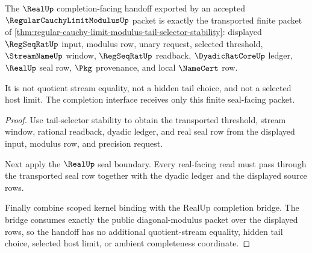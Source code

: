 \begin{theorem}
\label{thm:regular-cauchy-limit-modulus-real-seal-handoff}
The $\RealUp$ completion-facing handoff exported by an accepted $\RegularCauchyLimitModulusUp$ packet is exactly the transported finite packet of \autoref{thm:regular-cauchy-limit-modulus-tail-selector-stability}: displayed $\RegSeqRatUp$ input, modulus row, unary request, selected threshold, $\StreamNameUp$ window, $\RegSeqRatUp$ readback, $\DyadicRatCoreUp$ ledger, $\RealUp$ seal row, $\Pkg$ provenance, and local $\NameCert$ row.

It is not quotient stream equality, not a hidden tail choice, and not a selected host limit. The completion interface receives only this finite seal-facing packet.
\end{theorem}
\begin{proof}
Use tail-selector stability to obtain the transported threshold, stream window, rational readback, dyadic ledger, and real seal row from the displayed input, modulus row, and precision request.

Next apply the $\RealUp$ seal boundary. Every real-facing read must pass through the transported seal row together with the dyadic ledger and the displayed source rows.

Finally combine scoped kernel binding with the RealUp completion bridge. The bridge consumes exactly the public diagonal-modulus packet over the displayed rows, so the handoff has no additional quotient-stream equality, hidden tail choice, selected host limit, or ambient completeness coordinate.
\end{proof}


